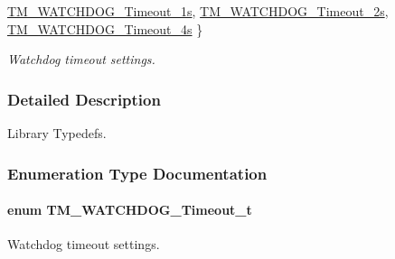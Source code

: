 \begin{DoxyCompactItemize}
\hyperlink{group___t_m___w_a_t_c_h_d_o_g___typedefs_gga3c9514e409e8cc70048b868ca9a64671a46d9f4e33c28c9e182bbbf48019b48a2}{T\+M\+\_\+\+W\+A\+T\+C\+H\+D\+O\+G\+\_\+\+Timeout\+\_\+1s}, 
\hyperlink{group___t_m___w_a_t_c_h_d_o_g___typedefs_gga3c9514e409e8cc70048b868ca9a64671ae8bcb0df93e0eeb1ee862a7a053ada58}{T\+M\+\_\+\+W\+A\+T\+C\+H\+D\+O\+G\+\_\+\+Timeout\+\_\+2s}, 
\hyperlink{group___t_m___w_a_t_c_h_d_o_g___typedefs_gga3c9514e409e8cc70048b868ca9a64671a578a86c87af4d8dcbad89e1e10e0f1c4}{T\+M\+\_\+\+W\+A\+T\+C\+H\+D\+O\+G\+\_\+\+Timeout\+\_\+4s}
 \}
\begin{DoxyCompactList}\small\item\em Watchdog timeout settings. \end{DoxyCompactList}\end{DoxyCompactItemize}


\subsubsection{Detailed Description}
Library Typedefs. 



\subsubsection{Enumeration Type Documentation}
\hypertarget{group___t_m___w_a_t_c_h_d_o_g___typedefs_ga3c9514e409e8cc70048b868ca9a64671}{}
\paragraph[{T\+M\+\_\+\+W\+A\+T\+C\+H\+D\+O\+G\+\_\+\+Timeout\+\_\+t}]{\setlength{\rightskip}{0pt plus 5cm}enum {\bf T\+M\+\_\+\+W\+A\+T\+C\+H\+D\+O\+G\+\_\+\+Timeout\+\_\+t}}\label{group___t_m___w_a_t_c_h_d_o_g___typedefs_ga3c9514e409e8cc70048b868ca9a64671}


Watchdog timeout settings. 

